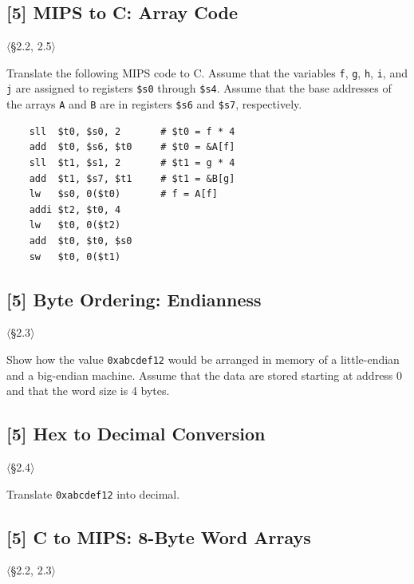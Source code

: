 \problembreak

\subsection{[5] MIPS to C: Array Code}
\hypertarget{prob-2.4}{}
\noindent$\langle$\S2.2, 2.5$\rangle$\medskip

\noindent Translate the following MIPS code to C. Assume that the variables
\texttt{f}, \texttt{g}, \texttt{h}, \texttt{i}, and \texttt{j} are assigned
to registers \texttt{\$s0} through \texttt{\$s4}. Assume that the base
addresses of the arrays \texttt{A} and \texttt{B} are in registers
\texttt{\$s6} and \texttt{\$s7}, respectively.
\begin{verbatim}
    sll  $t0, $s0, 2       # $t0 = f * 4
    add  $t0, $s6, $t0     # $t0 = &A[f]
    sll  $t1, $s1, 2       # $t1 = g * 4
    add  $t1, $s7, $t1     # $t1 = &B[g]
    lw   $s0, 0($t0)       # f = A[f]
    addi $t2, $t0, 4
    lw   $t0, 0($t2)
    add  $t0, $t0, $s0
    sw   $t0, 0($t1)
\end{verbatim}

\problembreak

\subsection{[5] Byte Ordering: Endianness}
\hypertarget{prob-2.5}{}
\noindent$\langle$\S2.3$\rangle$\medskip

\noindent Show how the value \texttt{0xabcdef12} would be arranged in memory
of a little-endian and a big-endian machine. Assume that the data are stored
starting at address 0 and that the word size is 4 bytes.

\problembreak

\subsection{[5] Hex to Decimal Conversion}
\hypertarget{prob-2.6}{}
\noindent$\langle$\S2.4$\rangle$\medskip

\noindent Translate \texttt{0xabcdef12} into decimal.

\problembreak

\subsection{[5] C to MIPS: 8-Byte Word Arrays}
\hypertarget{prob-2.7}{}
\noindent$\langle$\S2.2, 2.3$\rangle$\medskip

